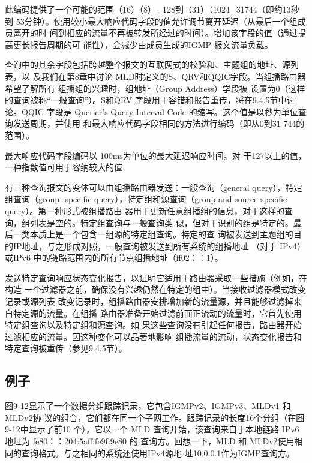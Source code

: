 此编码提供了一个可能的范围（16）（8）=128到（31）（1024=31744（即约13秒到
53分钟）。使用较小最大响应代码字段的值允许调节离开延迟（从最后一个组成员离开的时
间到相应的流量不再被转发所经过的时间）。增加该字段的值（通过提高更长报告周期的可
能性），会减少由成员生成的IGMP 报文流量负载。

查询中的其余字段包括跨越整个报文的互联网式的校验和、主题组的地址、源列表，以
及我们在第8章中讨论 MLD时定义的S、QRV和QQIC字段。当组播路由器希望了解所有
组播组的兴趣时，组地址（Group Address）学段被
设置为0（这样的查询被称“一般查询”）。S和QRV 字段用于容错和报告重传，将在9.4.5节中讨
论。QQIC 字段是 Querier’s Query Interval Code 的缩写。这个值是以秒为单位查询发送周期，并使用
和最大响应代码字段相同的方法进行编码（即从0到31 744的范围）。

最大响应代码字段编码以 100ms为单位的最大延迟响应时间。对
于127以上的值，一种指数值可用于容纳较大的值

有三种查询报文的变体可以由组播路由器发送：一般查询（general query），特定组查询（group-
specific query），特定组和源查询（group-and-source-specific query）。第一种形式被组播路由
器用于更新任意组播组的信息，对于这样的查询，组列表是空的。特定组查询与一般查询类
似，但对于识别的组是特定的。最后一类本质上是一个包含一组源的特定组查询。特定的查
询被发送到主题组的目的IP地址，与之形成对照，一般查询被发送到所有系统的组播地址
（对于 IPv4）或IPv6 中的链路范围内的所有节点组播地址（ff02：：1）。

发送特定查询响应状态变化报告，以证明它适用于路由器采取一些措施（例如，在构造
一个过滤器之前，确保没有兴趣仍然在特定的组中）。当接收过滤器模式改变记录或源列表
改变记录时，组播路由器安排增加新的流量源，并且能够过滤掉来自特定源的流量。在组播
路由器准备开始过滤前面正流动的流量时，它首先使用特定组查询以及特定组和源查询。如
果这些查询没有引起任何报告，路由器开始过滤相应的流量。因这种变化可以品著地影响
组播流量的流动，状态变化报告和特定查询被重传（参见9.4.5节）。

\subsection{例子}
图9-12显示了一个数据分组跟踪记录，它包含IGMPv2、IGMPv3、MLDv1 和MLDv2协
议的组合，它们都在同一个子网工作。跟踪记录的长度16个分组（在图9-12中显示了前10
个），它以一个 MLD 查询开始，该查询来自于本地链路 IPv6 地址为 fe80：：204:5aff:fe9f:9e80 的
查询方。回想一下，MLD 和 MLDv2使用相同的查询格式。与之相同的系统还使用IPv4源地
址10.0.0.1作为IGMP查询方。

